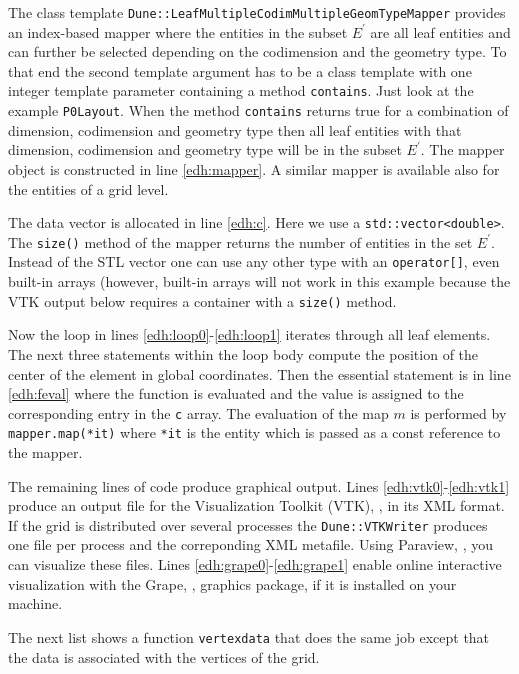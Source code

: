 \documentclass[11pt,a4paper,headinclude,footinclude,DIV16,normalheadings]{scrreprt}
\begin{document}
The class template
\lstinline!Dune::LeafMultipleCodimMultipleGeomTypeMapper!  provides an
index-based mapper where the entities in the subset $E^\prime$ are all
leaf entities and can further be selected depending on the codimension
and the geometry type. To that end the second template argument has to
be a class template with one integer template parameter containing a
method \lstinline!contains!. Just look at the example
\lstinline!P0Layout!. When the method \lstinline!contains!  returns
true for a combination of dimension, codimension and geometry type
then all leaf entities with that dimension, codimension and geometry
type will be in the subset $E^\prime$. The mapper object is
constructed in line \ref{edh:mapper}. A similar mapper is available
also for the entities of a grid level.

The data vector is allocated in line \ref{edh:c}. Here we use a
\lstinline!std::vector<double>!. The \lstinline!size()! method of the
mapper returns the number of entities in the set $E^\prime$. Instead
of the STL vector one can use any other type with an
\lstinline!operator[]!, even built-in arrays (however, built-in arrays
will not work in this example because the VTK output
below requires a container with a
\lstinline!size()! method. 

Now the loop in lines \ref{edh:loop0}-\ref{edh:loop1} iterates through
all leaf elements. The next three statements within the loop body
compute the position of the center of the element in global
coordinates. Then the essential statement is in line \ref{edh:feval}
where the function is evaluated and the value is assigned to the
corresponding entry in the \lstinline!c! array. The evaluation of the
map $m$ is performed by \lstinline!mapper.map(*it)!  where
\lstinline!*it! is the entity which is passed as a const reference to
the mapper.

The remaining lines of code produce graphical output. Lines
\ref{edh:vtk0}-\ref{edh:vtk1} produce an output file for the
Visualization Toolkit (VTK), \cite{VTK}, in its XML format. If the
grid is distributed over several processes the
\lstinline!Dune::VTKWriter! produces one file per process and the
correponding XML metafile. Using Paraview, \cite{Paraview}, you can
visualize these files. Lines \ref{edh:grape0}-\ref{edh:grape1} enable
online interactive visualization with the Grape, \cite{Grape},
graphics package, if it is installed on your machine.

The next list shows a function \lstinline!vertexdata! that does the
same job except that the data is associated with the vertices of the
grid. 
\end{document}
